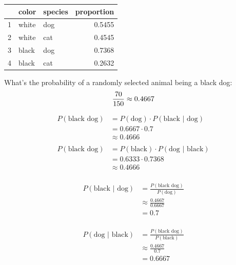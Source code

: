 \documentclass[landscape]{exam}
\begin{document}
  \begin{table}[ht]
    \begin{tabular}{rllr}
      \toprule
         & color & species & proportion \\
      \midrule
      1  & white & dog     & 0.5455 \\
      2  & white & cat     & 0.4545 \\
      \midrule
      3  & black & dog     & 0.7368 \\
      4  & black & cat     & 0.2632 \\
      \bottomrule
    \end{tabular}
  \end{table}

  What's the probability of a randomly selected animal being a black dog:
  \[
    \frac{70}{150} \approx 0.4667 \\
  \]

  \begin{align*}
    P(\text{black dog}) & = P(\text{dog}) \cdot P(\text{black } | \text{ dog}) \\
                        & = 0.6667 \cdot 0.7 \\
                        & \approx 0.4666 \\
                        \\
    P(\text{black dog}) & = P(\text{black}) \cdot P(\text{dog } | \text{ black}) \\
                        & = 0.6333 \cdot 0.7368 \\
                        & \approx 0.4666 \\
  \end{align*}

  \begin{align*}
    P(\text{black } | \text{ dog}) & = \frac{P(\text{black dog})}{P(\text{dog})} \\
                                   & \approx \frac{0.4667}{0.6667} \\
                                   & = 0.7 \\
  \end{align*}

  \begin{align*}
    P(\text{dog } | \text{ black}) & = \frac{P(\text{black dog})}{P(\text{black})} \\
                                   & \approx \frac{0.4667}{0.7} \\
                                   & = 0.6667 \\
  \end{align*}
\end{document}
